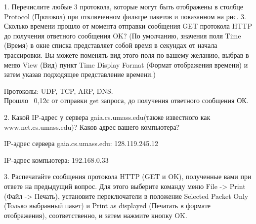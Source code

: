 \documentclass[a4paper,14pt]{extarticle}
\begin{document}
    \newpage

    1. Перечислите любые 3 протокола, которые могут быть отображены в столбце
    Protocol (Протокол) при отключенном фильтре пакетов и показанном на рис. 3.
    Сколько времени прошло от момента отправки сообщения GET протокола HTTP до
    получения ответного сообщения OK? (По умолчанию, значения поля Time (Время)
    в окне списка представляет собой время в секундах от начала трассировки. Вы
    можете поменять вид этого поля по вашему желанию, выбрав в меню View (Вид)
    пункт Time Display Format (Формат отображения времени) и затем указав
    подходящее представление времени.)

    Протоколы: UDP, TCP, ARP, DNS.\\
    Прошло ~0,12с от отправки get запроса, до получения ответного сообщения ОК.

    2. Какой IP-адрес у сервера gaia.cs.umass.edu(также известного как \\
    www.net.cs.umass.edu)? Каков адрес вашего компьютера?

    IP-адрес сервера gaia.cs.umass.edu: 128.119.245.12

    IP-адрес компьютера: 192.168.0.33

    3. Распечатайте сообщения протокола HTTP (GET и OK), полученные вами при ответе
    на предыдущий вопрос. Для этого выберите команду меню File -> Print (Файл ->
    Печать), установите переключатели в положение Selected Packet Only (Только
    выбранный пакет) и Print as displayed (Печатать в формате отображения),
    соответственно, и затем нажмите кнопку OK.
    
\end{document}
